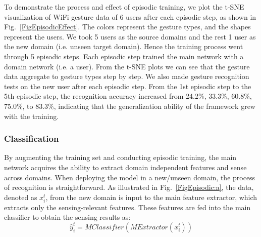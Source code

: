 \documentclass[journal]{IEEEtran}
\begin{document}
To demonstrate the process and effect of episodic training, we plot the t-SNE~\cite{tSNE:2008} visualization of WiFi gesture data of 6 users after each episodic step, as shown in Fig.~\ref{FigEpisodicEffect}. The colors represent the gesture types, and the shapes represent the users. We took 5 users as the source domains and the rest 1 user as the new domain (i.e. unseen target domain). Hence the training process went through 5 episodic steps. Each episodic step trained the main network with a domain network (i.e. a user). From the t-SNE plots we can see that the gesture data aggregate to gesture types step by step. We also made gesture recognition tests on the new user after each episodic step. From the 1st episodic step to the 5th episodic step, the recognition accuracy increased from 24.2\%, 33.3\%, 60.8\%, 75.0\%, to 83.3\%, indicating that the generalization ability of the framework grew with the training.
\begin{figure*}
\begin{center}
		\hspace{0.2cm}
		\hspace{0.2cm}
		\hspace{0.2cm}
		\hspace{0.2cm}
\caption{Process and effect of episodic training on WiFi gesture data (5 training users, 1 new user).}
\label{FigEpisodicEffect}
\end{center}
\end{figure*}

\subsubsection{Classification}
By augmenting the training set and conducting episodic training, the main network acquires the ability to extract domain independent features and sense across domains. When deploying the model in a new/unseen domain, the process of recognition is straightforward. As illustrated in Fig.~\ref{FigEpisodic:a}, the data, denoted as $x_{i}^{t}$, from the new domain is input to the main feature extractor, which extracts only the sensing-relevant features. These features are fed into the main classifier to obtain the sensing results as:
\begin{equation}
    \hat{y}_{i}^{t} = MClassifier(MExtractor(x_{i}^{t}))
\end{equation}
\end{document}
